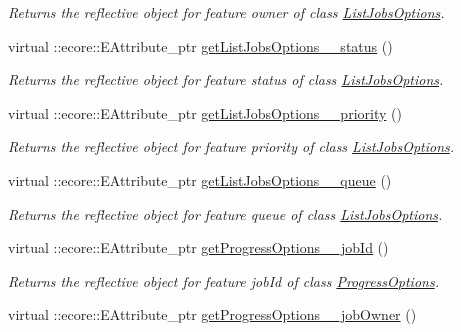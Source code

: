 \begin{DoxyCompactItemize}
\begin{DoxyCompactList}\small\item\em Returns the reflective object for feature owner of class \hyperlink{classTMS__Data_1_1ListJobsOptions}{ListJobsOptions}. \item\end{DoxyCompactList}\item 
virtual ::ecore::EAttribute\_\-ptr \hyperlink{classTMS__Data_1_1TMS__DataPackage_a703cb84f1d8a012d4886050fcc9cb37f}{getListJobsOptions\_\-\_\-status} ()
\begin{DoxyCompactList}\small\item\em Returns the reflective object for feature status of class \hyperlink{classTMS__Data_1_1ListJobsOptions}{ListJobsOptions}. \item\end{DoxyCompactList}\item 
virtual ::ecore::EAttribute\_\-ptr \hyperlink{classTMS__Data_1_1TMS__DataPackage_abe06440173a28acb05359f53ae7486a3}{getListJobsOptions\_\-\_\-priority} ()
\begin{DoxyCompactList}\small\item\em Returns the reflective object for feature priority of class \hyperlink{classTMS__Data_1_1ListJobsOptions}{ListJobsOptions}. \item\end{DoxyCompactList}\item 
virtual ::ecore::EAttribute\_\-ptr \hyperlink{classTMS__Data_1_1TMS__DataPackage_a097e38743761ebd914534a9b7535b748}{getListJobsOptions\_\-\_\-queue} ()
\begin{DoxyCompactList}\small\item\em Returns the reflective object for feature queue of class \hyperlink{classTMS__Data_1_1ListJobsOptions}{ListJobsOptions}. \item\end{DoxyCompactList}\item 
virtual ::ecore::EAttribute\_\-ptr \hyperlink{classTMS__Data_1_1TMS__DataPackage_a953087dacc343349520480b0e918cf02}{getProgressOptions\_\-\_\-jobId} ()
\begin{DoxyCompactList}\small\item\em Returns the reflective object for feature jobId of class \hyperlink{classTMS__Data_1_1ProgressOptions}{ProgressOptions}. \item\end{DoxyCompactList}\item 
virtual ::ecore::EAttribute\_\-ptr \hyperlink{classTMS__Data_1_1TMS__DataPackage_a9f1c1e7e28d0c981d494b31cd340c5f2}{getProgressOptions\_\-\_\-jobOwner} ()

\end{DoxyCompactItemize}
